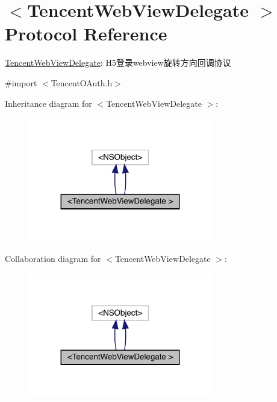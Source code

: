 \hypertarget{protocol_tencent_web_view_delegate_01-p}{}\section{$<$Tencent\+Web\+View\+Delegate $>$ Protocol Reference}
\label{protocol_tencent_web_view_delegate_01-p}


\mbox{\hyperlink{class_tencent_web_view_delegate-p}{Tencent\+Web\+View\+Delegate}}\+: H5登录webview旋转方向回调协议  




{\ttfamily \#import $<$Tencent\+O\+Auth.\+h$>$}



Inheritance diagram for $<$Tencent\+Web\+View\+Delegate $>$\+:\nopagebreak
\begin{figure}[H]
\begin{center}
\leavevmode
\includegraphics[width=227pt]{protocol_tencent_web_view_delegate_01-p__inherit__graph}
\end{center}
\end{figure}


Collaboration diagram for $<$Tencent\+Web\+View\+Delegate $>$\+:\nopagebreak
\begin{figure}[H]
\begin{center}
\leavevmode
\includegraphics[width=227pt]{protocol_tencent_web_view_delegate_01-p__coll__graph}
\end{center}
\end{figure}
